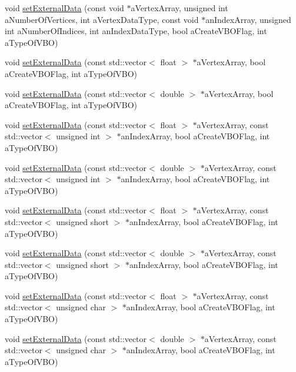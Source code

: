 \begin{DoxyCompactItemize}
void \hyperlink{class_graphics_1_1_triangle_mesh_a6d0362b072582c78f06d89fe51851ff4}{setExternalData} (const void $\ast$aVertexArray, unsigned int aNumberOfVertices, int aVertexDataType, const void $\ast$anIndexArray, unsigned int aNumberOfIndices, int anIndexDataType, bool aCreateVBOFlag, int aTypeOfVBO)
\item 
void \hyperlink{class_graphics_1_1_triangle_mesh_a110dd57a6619a10097c9abb920bc3473}{setExternalData} (const std::vector$<$ float $>$ $\ast$aVertexArray, bool aCreateVBOFlag, int aTypeOfVBO)
\item 
void \hyperlink{class_graphics_1_1_triangle_mesh_ae90ee2bc9f71814351266f82a99180dc}{setExternalData} (const std::vector$<$ double $>$ $\ast$aVertexArray, bool aCreateVBOFlag, int aTypeOfVBO)
\item 
void \hyperlink{class_graphics_1_1_triangle_mesh_a5fa2965e5581998b8081ba1588a0356f}{setExternalData} (const std::vector$<$ float $>$ $\ast$aVertexArray, const std::vector$<$ unsigned int $>$ $\ast$anIndexArray, bool aCreateVBOFlag, int aTypeOfVBO)
\item 
void \hyperlink{class_graphics_1_1_triangle_mesh_ad2502e0bfa0b65e0e25e5271438f9cb3}{setExternalData} (const std::vector$<$ double $>$ $\ast$aVertexArray, const std::vector$<$ unsigned int $>$ $\ast$anIndexArray, bool aCreateVBOFlag, int aTypeOfVBO)
\item 
void \hyperlink{class_graphics_1_1_triangle_mesh_ae5fc3b00004b69998028380c7d011335}{setExternalData} (const std::vector$<$ float $>$ $\ast$aVertexArray, const std::vector$<$ unsigned short $>$ $\ast$anIndexArray, bool aCreateVBOFlag, int aTypeOfVBO)
\item 
void \hyperlink{class_graphics_1_1_triangle_mesh_a05f2a078113ffb8c80820a03a52b9bb2}{setExternalData} (const std::vector$<$ double $>$ $\ast$aVertexArray, const std::vector$<$ unsigned short $>$ $\ast$anIndexArray, bool aCreateVBOFlag, int aTypeOfVBO)
\item 
void \hyperlink{class_graphics_1_1_triangle_mesh_a7a1216e1ed938b74bda09845d27f3658}{setExternalData} (const std::vector$<$ float $>$ $\ast$aVertexArray, const std::vector$<$ unsigned char $>$ $\ast$anIndexArray, bool aCreateVBOFlag, int aTypeOfVBO)
\item 
void \hyperlink{class_graphics_1_1_triangle_mesh_a58fcb5b1323d0d7d7246e0063dad66c3}{setExternalData} (const std::vector$<$ double $>$ $\ast$aVertexArray, const std::vector$<$ unsigned char $>$ $\ast$anIndexArray, bool aCreateVBOFlag, int aTypeOfVBO)
\item 

\end{DoxyCompactItemize}
